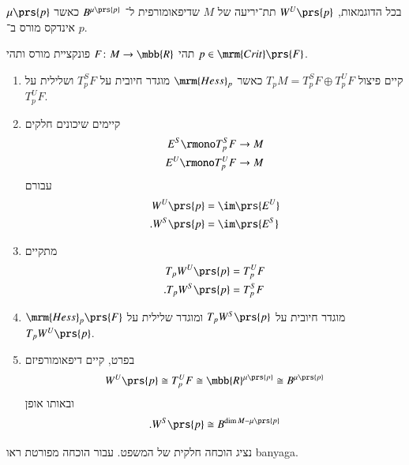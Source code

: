 \documentclass[a4paper,10pt,twoside,openany]{book}
\begin{document}
\begin{remark}
בכל הדוגמאות,
$W^U\prs{p}$
תת־יריעה של
$M$
שדיפאומורפית ל־%
$B^{\mu\prs{p}}$
כאשר
$\mu\prs{p}$
אינדקס מורס ב־%
$p$.
\end{remark}

\begin{theorem}
תהי
$F \colon M \to \mbb{R}$
פונקציית מורס ותהי
$p \in \mrm{Crit}\prs{F}$.
\begin{enumerate}
\item קיים פיצול
$T_p M = T_p^SF \oplus T_p^UF$
כאשר
$\mrm{Hess}_p$
מוגדר חיובית על
$T_p^SF$
ושלילית על
$T_p^UF$.
\item קיימים שיכונים חלקים
\begin{align*}
E^S \rmono T_p^S F &\to M \\
E^U \rmono T_p^U F &\to M
\end{align*}
עבורם
\begin{align*}
W^U\prs{p} &= \im\prs{E^U} \\
\text{.} W^S\prs{p} &= \im \prs{E^S}
\end{align*}
\item מתקיים
\begin{align*}
T_p W^U\prs{p} &= T_p^U F \\
\text{.} T_pW^S\prs{p} &= T_p^S F
\end{align*}
\item $\mrm{Hess}_p\prs{F}$
מוגדר חיובית על
$T_p W^S\prs{p}$
ומוגדר שלילית על
$T_p W^U\prs{p}$.
\item בפרט,
קיים דיפאומורפיזם
\[W^U\prs{p} \cong T_p^U F \cong \mbb{R}^{\mu\prs{p}} \cong B^{\mu\prs{p}}\]
ובאותו אופן
\[\text{.} W^S\prs{p} \cong B^{\dim M - \mu\prs{p}}\]
\end{enumerate}
\end{theorem}

נציג הוכחה חלקית של המשפט. עבור הוכחה מפורטת ראו
\textenglish{banyaga}.
\end{document}
